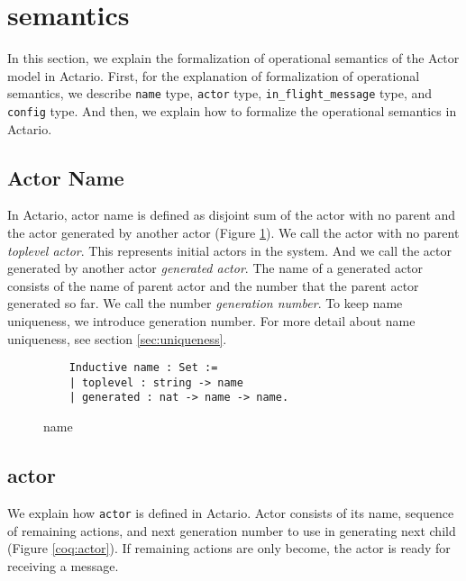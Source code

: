 \section{semantics}
\label{sec:semantics}

In this section, we explain the formalization of operational semantics of the Actor model in Actario.
First, for the explanation of formalization of operational semantics, we describe \lstinline|name| type, \lstinline|actor| type, \lstinline|in_flight_message| type, and \lstinline|config| type.
And then, we explain how to formalize the operational semantics in Actario.

\subsection{Actor Name}
In Actario, actor name is defined as disjoint sum of the actor with no parent and the actor generated by another actor (Figure \ref{coq:name}).
We call the actor with no parent \textit{toplevel actor}.
This represents initial actors in the system.
And we call the actor generated by another actor \textit{generated actor}.
The name of a generated actor consists of the name of parent actor and the number that the parent actor generated so far.
We call the number \textit{generation number}.
To keep name uniqueness, we introduce generation number.
For more detail about name uniqueness, see section \ref{sec:uniqueness}.


\begin{figure}[t]
  \begin{lstlisting}
    Inductive name : Set :=
    | toplevel : string -> name
    | generated : nat -> name -> name.
  \end{lstlisting}
  \caption{name}\label{coq:name}
\end{figure}


\subsection{actor}
We explain how \lstinline|actor| is defined in Actario.
Actor consists of its name, sequence of remaining actions, and next generation number to use in generating next child (Figure \ref{coq:actor}).
If remaining actions are only \textsf{become}, the actor is ready for receiving a message.

